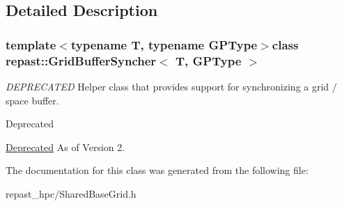 \subsection{Detailed Description}
\subsubsection*{template$<$typename T, typename G\-P\-Type$>$class repast\-::\-Grid\-Buffer\-Syncher$<$ T, G\-P\-Type $>$}

{\itshape D\-E\-P\-R\-E\-C\-A\-T\-E\-D} Helper class that provides support for synchronizing a grid / space buffer. 

\begin{DoxyRefDesc}{Deprecated}
\item[\hyperlink{deprecated__deprecated000002}{Deprecated}]As of Version 2. \end{DoxyRefDesc}


The documentation for this class was generated from the following file\-:\begin{DoxyCompactItemize}
\item 
repast\-\_\-hpc/Shared\-Base\-Grid.\-h\end{DoxyCompactItemize}
